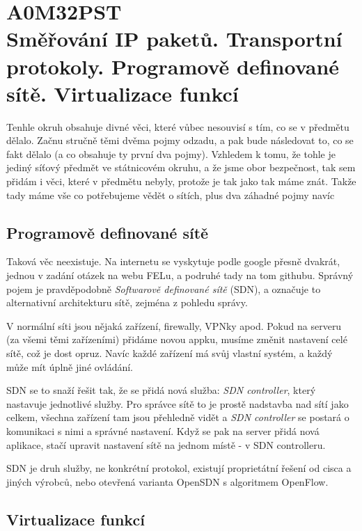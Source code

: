 \chapter[Pokročilé síťové technologie]{A0M32PST \\[1ex]\Large{Směřování IP paketů. Transportní protokoly. Programově definované sítě. Virtualizace funkcí}}



Tenhle okruh obsahuje divné věci, které vůbec nesouvisí s tím, co se v předmětu dělalo. Začnu stručně těmi dvěma pojmy odzadu, a pak bude následovat to, co se fakt dělalo (a co obsahuje ty první dva pojmy). Vzhledem k tomu, že tohle je jediný síťový předmět ve státnicovém okruhu, a že jsme obor bezpečnost, tak sem přidám i věci, které v předmětu nebyly, protože je tak jako tak máme znát. Takže tady máme vše co potřebujeme vědět o sítích, plus dva záhadné pojmy navíc



\section{Programově definované sítě}

Taková věc neexistuje. Na internetu se vyskytuje podle google přesně dvakrát, jednou v zadání otázek na webu FELu, a podruhé tady na tom githubu. Správný pojem je pravděpodobně \textit{Softwarově definované sítě} (SDN), a označuje to alternativní architekturu sítě, zejména z pohledu správy.

V normální síti jsou nějaká zařízení, firewally, VPNky apod. Pokud na serveru (za všemi těmi zařízeními) přidáme novou appku, musíme změnit nastavení celé sítě, což je dost opruz. Navíc každé zařízení má svůj vlastní systém, a každý může mít úplně jiné ovládání.

SDN se to snaží řešit tak, že se přidá nová služba: \textit{SDN controller}, který nastavuje jednotlivé služby. Pro správce sítě to je prostě nadstavba nad sítí jako celkem, všechna zařízení tam jsou přehledně vidět a \textit{SDN controller} se postará o komunikaci s nimi a správné nastavení. Když se pak na server přidá nová aplikace, stačí upravit nastavení sítě na jednom místě - v SDN controlleru.

SDN je druh služby, ne konkrétní protokol, existují proprietátní řešení od cisca a jiných výrobců, nebo otevřená varianta OpenSDN s algoritmem OpenFlow.



\section{Virtualizace funkcí}

